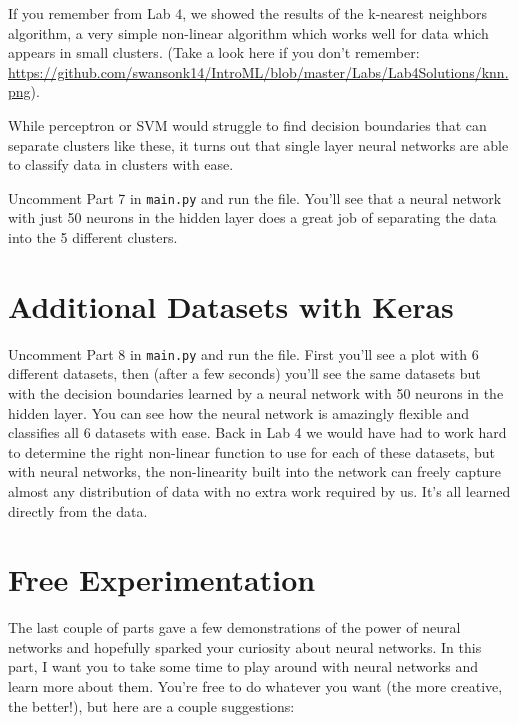 \documentclass{article}
\begin{document}
If you remember from Lab 4, we showed the results of the k-nearest neighbors algorithm, a very simple non-linear algorithm which works well for data which appears in small clusters. (Take a look here if you don't remember: \url{https://github.com/swansonk14/IntroML/blob/master/Labs/Lab4Solutions/knn.png}).

While perceptron or SVM would struggle to find decision boundaries that can separate clusters like these, it turns out that single layer neural networks are able to classify data in clusters with ease.

Uncomment Part 7 in \texttt{main.py} and run the file. You'll see that a neural network with just 50 neurons in the hidden layer does a great job of separating the data into the 5 different clusters.

\section{Additional Datasets with Keras}

Uncomment Part 8 in \texttt{main.py} and run the file. First you'll see a plot with 6 different datasets, then (after a few seconds) you'll see the same datasets but with the decision boundaries learned by a neural network with 50 neurons in the hidden layer. You can see how the neural network is amazingly flexible and classifies all 6 datasets with ease. Back in Lab 4 we would have had to work hard to determine the right non-linear function to use for each of these datasets, but with neural networks, the non-linearity built into the network can freely capture almost any distribution of data with no extra work required by us. It's all learned directly from the data.

\section{Free Experimentation}

The last couple of parts gave a few demonstrations of the power of neural networks and hopefully sparked your curiosity about neural networks. In this part, I want you to take some time to play around with neural networks and learn more about them. You're free to do whatever you want (the more creative, the better!), but here are a couple suggestions:
\end{document}
